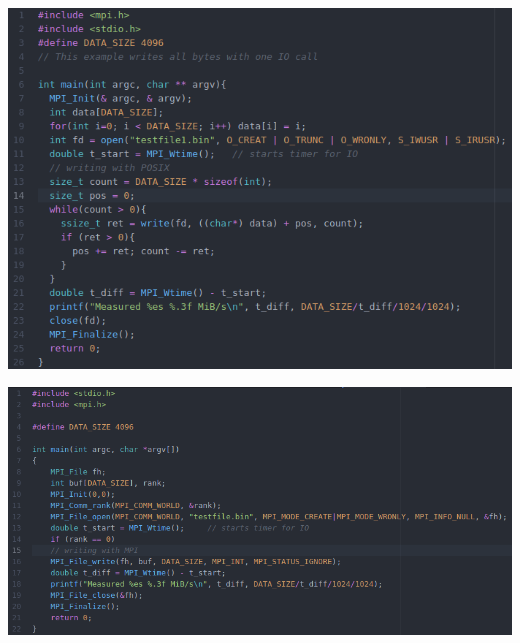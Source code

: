 \documentclass[compress,11pt,xcolor=svgnames,aspectratio=169]{beamer}
\begin{document}
\begin{frame}[fragile]{}

\begin{center}
\includegraphics[scale=0.6]{fig/prog-posix2}
\end{center}

\end{frame}

\begin{frame}[fragile]{}

\begin{center}
\includegraphics[scale=0.6]{fig/prog-mpi}
\end{center}

\end{frame}
\end{document}
